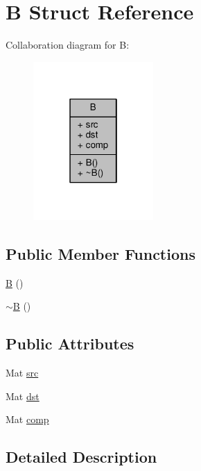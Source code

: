 \hypertarget{struct_b}{}\section{B Struct Reference}
\label{struct_b}


Collaboration diagram for B\+:\nopagebreak
\begin{figure}[H]
\begin{center}
\leavevmode
\includegraphics[width=130pt]{struct_b__coll__graph}
\end{center}
\end{figure}
\subsection*{Public Member Functions}
\begin{DoxyCompactItemize}
\item 
\hyperlink{struct_b_a9532a74021f7efb003dffbc9d4145e65}{B} ()
\item 
\hyperlink{struct_b_abf3bb815dcba0116aee6f0e87d694702}{$\sim$\+B} ()
\end{DoxyCompactItemize}
\subsection*{Public Attributes}
\begin{DoxyCompactItemize}
\item 
Mat \hyperlink{struct_b_a678f871ba71d1e313ef4f02c72daff60}{src}
\item 
Mat \hyperlink{struct_b_a42c8a8a887d60baf5cad68219df40aa3}{dst}
\item 
Mat \hyperlink{struct_b_a255bb9e995f9115cb12fef9911dcfc2e}{comp}
\end{DoxyCompactItemize}


\subsection{Detailed Description}



